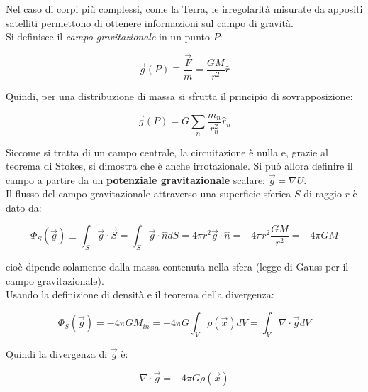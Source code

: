 \documentclass[a4paper,12pt]{book}
\begin{document}
\noindent
Nel caso di corpi più complessi, come la Terra, le irregolarità misurate da appositi satelliti permettono di ottenere informazioni sul campo di gravità.\\

\noindent Si definisce il \textit{campo gravitazionale} in un punto $P$:

\begin{equation}
    \vec{g}(P) \equiv \frac{\vec{F}}{m} = \frac{GM}{r^2} \hat{r}
\end{equation}

\noindent
Quindi, per una distribuzione di massa si sfrutta il principio di sovrapposizione:

\begin{equation}
    \vec{g}(P) = G \sum_{n} \frac{m_n}{r_n^2} \hat{r}_n
    \label{eq:campo_gravitazionale}
\end{equation}

\noindent
Siccome si tratta di un campo centrale, la circuitazione è nulla e, grazie al teorema di Stokes, si dimostra che è anche irrotazionale.
Si può allora definire il campo a partire da un \textbf{potenziale gravitazionale} scalare: $\vec{g} = \nabla U$.\\

\noindent
Il flusso del campo gravitazionale attraverso una superficie sferica $S$ di raggio $r$ è dato da:

\begin{equation}
    \Phi_S (\vec{g}) \equiv \int_S \vec{g} \cdot \vec{S} = \int_S \vec{g} \cdot \hat{n} dS = 4 \pi r^2 \vec{g} \cdot \hat{n} = - 4 \pi r^2 \frac{GM}{r^2} = - 4 \pi GM
\end{equation}

\noindent
cioè dipende solamente dalla massa contenuta nella sfera (legge di Gauss per il campo gravitazionale).\\

\noindent
Usando la definizione di densità e il teorema della divergenza:

\begin{equation}
    \Phi_S (\vec{g}) = -4 \pi G M_{in} = -4 \pi G \int_V \rho (\vec{x}) dV = \int_V \nabla \cdot \vec{g} dV
\end{equation}

\noindent
Quindi la divergenza di $\vec{g}$ è:

\begin{equation}
    \nabla \cdot \vec{g} = - 4 \pi G \rho (\vec{x})
\end{equation}
\end{document}
